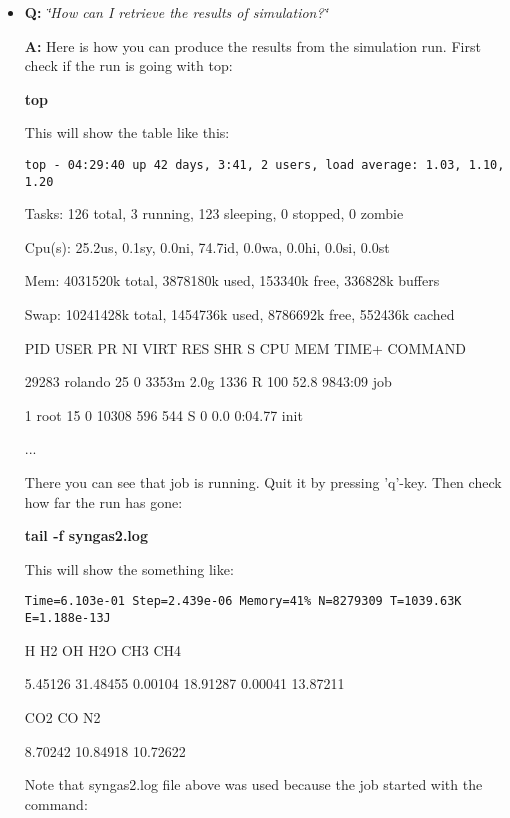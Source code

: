 \begin{itemize}
\item {\bf Q:} {\em \char`\"{}How can I retrieve the results of simulation?\char`\"{}\/} \par
{\bf A:} Here is how you can produce the results from the simulation run. First check if the run is going with top: \par
\par
{\bf  top }\par
\par
 This will show the table like this: \par
\par
{\tt  top - 04:29:40 up 42 days, 3:41, 2 users, load average: 1.03, 1.10, 1.20\par
 Tasks: 126 total, 3 running, 123 sleeping, 0 stopped, 0 zombie\par
 Cpu(s): 25.2us, 0.1sy, 0.0ni, 74.7id, 0.0wa, 0.0hi, 0.0si, 0.0st\par
 Mem: 4031520k total, 3878180k used, 153340k free, 336828k buffers\par
 Swap: 10241428k total, 1454736k used, 8786692k free, 552436k cached\par
 \par
 PID USER PR NI VIRT RES SHR S CPU MEM TIME+ COMMAND\par
 29283 rolando 25 0 3353m 2.0g 1336 R 100 52.8 9843:09 job\par
 1 root 15 0 10308 596 544 S 0 0.0 0:04.77 init\par
 ...\par
 } There you can see that job is running. Quit it by pressing 'q'-key. Then check how far the run has gone: \par
\par
{\bf  tail -f syngas2.log }\par
\par
 This will show the something like:\par
\par
{\tt  Time=6.103e-01 Step=2.439e-06 Memory=41\% N=8279309 T=1039.63K E=1.188e-13J\par
 H H2 OH H2O CH3 CH4\par
 5.45126 31.48455 0.00104 18.91287 0.00041 13.87211\par
 CO2 CO N2\par
 8.70242 10.84918 10.72622\par
 \par
\par
 Note that syngas2.log file above was used because the job started with the command: \par
}
\end{itemize}
